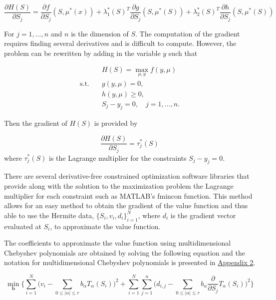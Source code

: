 \documentclass[12pt]{article}
\begin{document}
\begin{equation*}
  \frac{\partial H(S)}{\partial S_j} =\frac{\partial f}{\partial S_j}(S, \mu^*(x)) + \lambda_1^*(S)^T\frac{\partial g}{\partial S_j}(S, \mu^*(S)) + \lambda_2^*(S)^T\frac{\partial h}{\partial S_j}(S, \mu^*(S))
\end{equation*}

For $j=1,\dots,n$ and $n$ is the dimension of $S$. The computation of the gradient requires finding several derivatives and is difficult to compute. However, the problem can be rewritten by adding in the variable $y$ such that

\begin{equation}
  \begin{aligned}
    & H(S)=\max_{\mu,y} f(y,\mu) \\
    \text{s.t.}\quad & g(y, \mu)=0,\\
    & h(y,\mu) \geq 0,\\
    & S_j-y_j=0,\quad j=1,\dots,n.
  \end{aligned}
  \label{equationB}
\end{equation}

Then the gradient of $H(S)$ is provided by

\begin{equation*}
  \frac{\partial H(S)}{\partial S_j} = \tau^*_j(S)
\end{equation*}
where $\tau^*_j(S)$ is the Lagrange multiplier for the constraints $S_j-y_j=0$.

There are several derivative-free constrained optimization software libraries that provide along with the solution to the maximization problem the Lagrange multiplier for each constraint such as MATLAB's fmincon function. This method allows for an easy method to obtain the gradient of the value function and thus able to use the Hermite data, $\{S_i,v_i,d_i\}_{i=1}^N$, where $d_i$ is the gradient vector evaluated at $S_i$, to approximate the value function.

The coefficients to approximate the value function using multidimensional Chebyshev polynomials are obtained by solving the following equation and the notation for multidimensional Chebyshev polynomials is presented in \hyperref[multicheb]{Appendix 2}.

\begin{equation*}
  \min_{\boldsymbol{b}} \Bigg \{\sum_{i=1}^N \bigg (v_i-\sum_{0\leq |\alpha|\leq r}b_\alpha T_\alpha(S_i) \bigg )^2+\sum_{i=1}^N \sum_{j=1}^{n} \bigg ( d_{i,j} - \sum_{0\leq |\alpha|\leq r}b_\alpha \frac{\partial}{\partial S_j}T_\alpha(S_i) \bigg )^2 \Bigg \}
\end{equation*}
\end{document}
